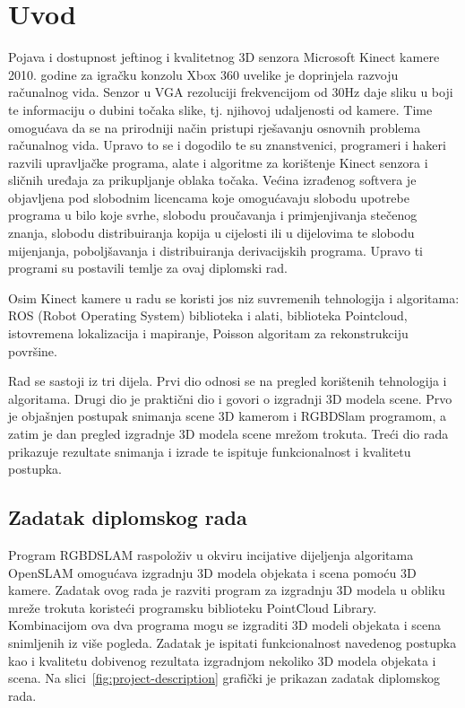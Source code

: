 \newpage

\setcounter{page}{1}
\setcounter{figure}{0}
\section{Uvod}%
\label{sec:Uvod}

Pojava i dostupnost jeftinog i kvalitetnog 3D senzora Microsoft Kinect
kamere 2010. godine za igračku konzolu Xbox 360 uvelike je doprinjela
razvoju računalnog vida. Senzor u VGA rezoluciji frekvencijom od 30Hz
daje sliku u boji te informaciju o dubini točaka slike, tj. njihovoj
udaljenosti od kamere. Time omogućava da se na prirodniji način pristupi
rješavanju osnovnih problema računalnog vida.  Upravo to se i dogodilo
te su znanstvenici, programeri i hakeri razvili upravljačke programa,
alate i algoritme za korištenje Kinect senzora i sličnih uređaja za
prikupljanje oblaka točaka. Većina izrađenog softvera je objavljena pod
slobodnim licencama koje omogućavaju slobodu upotrebe programa u bilo
koje svrhe, slobodu proučavanja i primjenjivanja stečenog znanja,
slobodu distribuiranja kopija u cijelosti ili u dijelovima te slobodu
mijenjanja, poboljšavanja i distribuiranja derivacijskih programa.
Upravo ti programi su postavili temlje za ovaj diplomski rad.

Osim Kinect kamere u radu se koristi jos niz suvremenih tehnologija i
algoritama: ROS (Robot Operating System) biblioteka i alati, biblioteka
Pointcloud, istovremena lokalizacija i mapiranje, Poisson algoritam za
rekonstrukciju površine.

Rad se sastoji iz tri dijela. Prvi dio odnosi se na pregled korištenih
tehnologija i algoritama. Drugi dio je praktični dio i govori o
izgradnji 3D modela scene. Prvo je objašnjen postupak snimanja scene 3D
kamerom i RGBDSlam programom, a zatim je dan pregled izgradnje 3D modela
scene mrežom trokuta. Treći dio rada prikazuje rezultate snimanja i
izrade te ispituje funkcionalnost i kvalitetu postupka.

\newpage
\subsection{Zadatak diplomskog rada} %
\label{sub:Zadatak diplomskog rada}

Program RGBDSLAM raspoloživ u okviru incijative dijeljenja algoritama
OpenSLAM omogućava izgradnju 3D modela objekata i scena pomoću 3D
kamere. Zadatak ovog rada je razviti program za izgradnju 3D modela u
obliku mreže trokuta koristeći programsku biblioteku PointCloud Library.
Kombinacijom ova dva programa mogu se izgraditi 3D modeli objekata i
scena snimljenih iz više pogleda. Zadatak je ispitati funkcionalnost
navedenog postupka kao i kvalitetu dobivenog rezultata izgradnjom
nekoliko 3D modela objekata i scena. Na
slici~\ref{fig:project-description} grafički je prikazan zadatak
diplomskog rada.

